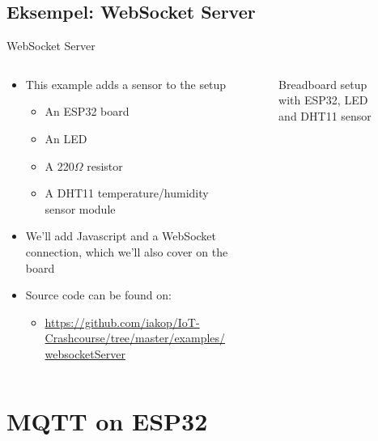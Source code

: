 \documentclass[aspectratio=169]{beamer}
\begin{document}
\subsection{Eksempel: WebSocket Server}
\begin{frame}{WebSocket Server}
\begin{columns}
	\begin{column}{0.6\textwidth}
		\begin{textBox}
		\begin{itemize}
			\item This example adds a sensor to the setup
			\begin{itemize}
				\item An ESP32 board
				\item An LED
				\item A 220{\textsf{$\Omega$}} resistor
				\item A DHT11 temperature/humidity sensor module
			\end{itemize}
			\item We'll add Javascript and a WebSocket connection, which we'll also cover on the board
			\item Source code can be found on:
			\begin{itemize}
				\item \tiny\url{https://github.com/iakop/IoT-Crashcourse/tree/master/examples/websocketServer}
			\end{itemize}
		\end{itemize}
		\end{textBox}
	\end{column}
	\begin{column}{0.4\textwidth}
		\centering
		\begin{figure}
  			
  			\caption{Breadboard setup with ESP32, LED and DHT11 sensor}
  			\label{fig:esp32-led-dht11}
		\end{figure}
	\end{column}
\end{columns}
\end{frame}

\section{MQTT on ESP32}
\begin{frame}
\end{frame}
\end{document}
